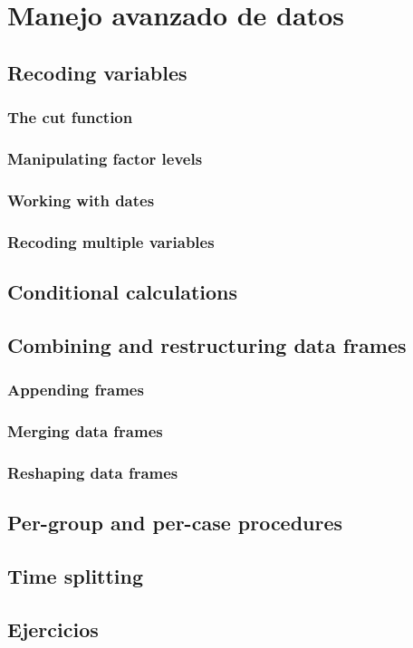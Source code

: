 \chapter{Manejo avanzado de datos}
\section{Recoding variables}
\subsection{The cut function}
\subsection{Manipulating factor levels}
\subsection{Working with dates}
\subsection{Recoding multiple variables}
\section{Conditional calculations}
\section{Combining and restructuring data frames}
\subsection{Appending frames} \label{appending frames}
\subsection{Merging data frames}
\subsection{Reshaping data frames}
\section{Per-group and per-case procedures}
\section{Time splitting}
\section{Ejercicios}
